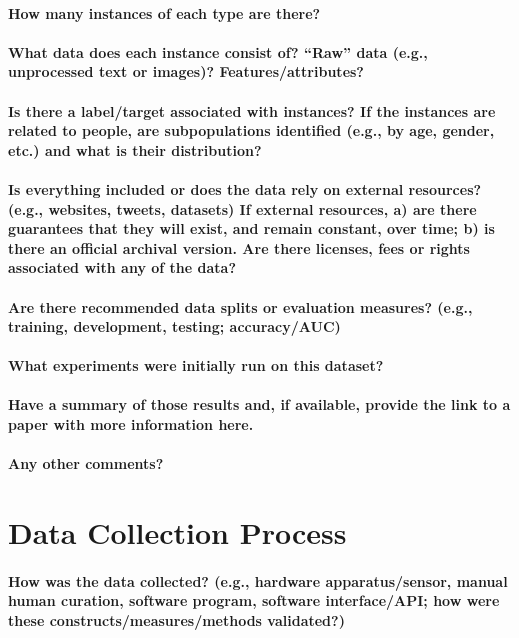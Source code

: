\documentclass{article}
\begin{document}
\begin{multicols}{2}
\paragraph{How many instances of each type are there?}
\paragraph{What data does each instance consist of? “Raw” data
(e.g., unprocessed text or images)? Features/attributes?}
\paragraph{Is there a label/target associated with instances? If the
instances are related to people, are subpopulations identified
(e.g., by age, gender, etc.) and what is their distribution?}
\paragraph{Is everything included or does the data rely on external
resources? (e.g., websites, tweets, datasets) If external
resources, a) are there guarantees that they will exist, and
remain constant, over time; b) is there an official archival
version. Are there licenses, fees or rights associated with
any of the data?}
\paragraph{Are there recommended data splits or evaluation measures? (e.g., training, development, testing; accuracy/AUC)}
\paragraph{What experiments were initially run on this dataset?}
\paragraph{Have a summary of those results and, if available, provide
the link to a paper with more information here.}
\paragraph{Any other comments?}
\section{Data Collection Process}
\paragraph{How was the data collected? (e.g., hardware apparatus/sensor, manual human curation, software program, software interface/API; how were these constructs/measures/methods validated?)}

\end{multicols}
\end{document}
